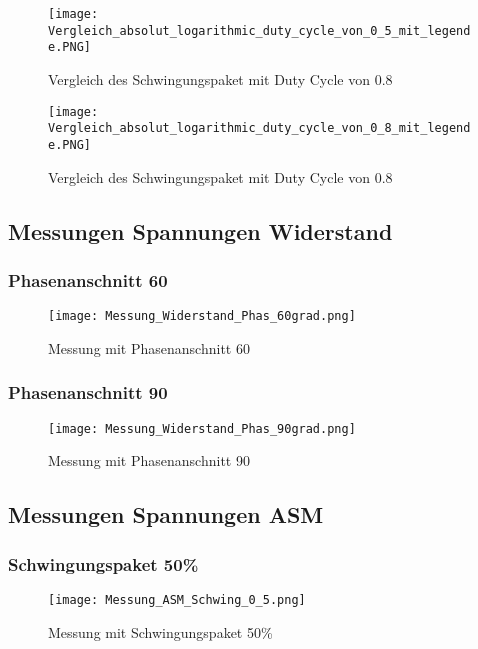 \begin{appendix}
\begin{figure}[ht!]
	\centering
	\texttt{[image: Vergleich\_absolut\_logarithmic\_duty\_cycle\_von\_0\_5\_mit\_legende.PNG]}	
	\caption{Vergleich des Schwingungspaket mit Duty Cycle von 0.8}
	\label{fig:Vergleich_absolut_logarithmic_duty_cycle_von_0_5_mit_legende}
\end{figure}

\begin{figure}[ht!]
	\centering
	\texttt{[image: Vergleich\_absolut\_logarithmic\_duty\_cycle\_von\_0\_8\_mit\_legende.PNG]}	
	\caption{Vergleich des Schwingungspaket mit Duty Cycle von 0.8}
	\label{fig:Vergleich_absolut_logarithmic_duty_cycle_von_0_8_mit_legende}
\end{figure}

\newpage
\subsection{Messungen Spannungen Widerstand}\label{sec:Mess_Spannung_Widerstand}
\subsubsection*{Phasenanschnitt 60\textdegree}

\begin{figure}[ht!]
	\centering
	\texttt{[image: Messung\_Widerstand\_Phas\_60grad.png]}	
	\caption{Messung mit Phasenanschnitt 60\textdegree}\label{fig:Mess_Phas_60}
\end{figure}
\newpage
\subsubsection*{Phasenanschnitt 90\textdegree}
\begin{figure}[ht!]
	\centering
	\texttt{[image: Messung\_Widerstand\_Phas\_90grad.png]}	
	\caption{Messung mit Phasenanschnitt 90\textdegree}\label{fig:Mess_Phas_90}
\end{figure}

\newpage
\subsection{Messungen Spannungen ASM}\label{sec:Mess_Spannung_ASM}
\subsubsection*{Schwingungspaket 50\%}
\begin{figure}[ht!]
	\centering
	\texttt{[image: Messung\_ASM\_Schwing\_0\_5.png]}	
	\caption{Messung mit Schwingungspaket 50\%}\label{fig:Mess_ASM_Schwing_0_5}
\end{figure}


\end{appendix}
